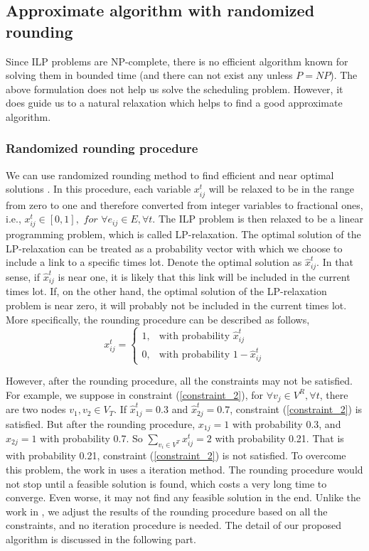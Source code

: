 \documentclass[conference]{IEEEtran}
\begin{document}
\subsection{Approximate algorithm with randomized rounding}

Since ILP problems are NP-complete, there is no efficient algorithm
known for solving them in bounded time (and there can not exist any
unless $P=NP$). The above formulation does not help us solve the
scheduling problem. However, it does guide us to a natural
relaxation which helps to find a good approximate algorithm.
\subsubsection{Randomized rounding procedure}

We can use randomized rounding method to find efficient and near
optimal solutions \cite{raghavan1987rrt}. In this procedure, each
variable $x_{ij}^t$ will be relaxed to be in the range from zero to
one and therefore converted from integer variables to fractional
ones, i.e., $x_{ij}^t \in [0,1], \,\, for \,\,\forall e_{ij}\in E,
\forall t$. The ILP problem is then relaxed to be a linear
programming problem, which is called LP-relaxation. The optimal
solution of the LP-relaxation can be treated as a probability vector
with which we choose to include a link to a specific times lot.
Denote the optimal solution as $\hat{x}_{ij}^t$. In that sense, if
$\hat{x}_{ij}^t$ is near one, it is likely that this link will be
included in the current times lot. If, on the other hand, the
optimal solution of the LP-relaxation problem is near zero, it will
probably not be included in the current times lot. More
specifically, the rounding procedure can be described as follows,
\begin{equation} \label{blean varible x}
x_{ij}^t = \left\{
\begin{array}{ll}
1, & \mbox{with probability}\,\, \hat{x}_{ij}^t\\
0, & \mbox{with probability}\,\, 1-\hat{x}_{ij}^t
\end{array}
\right.
\end{equation}

However, after the rounding procedure, all the constraints may not
be satisfied. For example, we suppose in constraint
(\ref{constraint_2}), for $\forall v_j\in V^R, \forall t$, there are
two nodes $v_{1}, v_{2}\in V_{T}$. If $\hat{x}_{1j}^t = 0.3$ and
$\hat{x}_{2j}^t = 0.7$, constraint (\ref{constraint_2}) is
satisfied. But after the rounding procedure, $x_{1j}=1$ with
probability 0.3, and $x_{2j}=1$ with probability 0.7. So
$\sum_{v_i\in V^T} x_{ij}^t = 2$ with probability 0.21. That is with
probability 0.21, constraint (\ref{constraint_2}) is not satisfied.
To overcome this problem, the work in \cite{friderikos2006non} uses
a iteration method. The rounding procedure would not stop until a
feasible solution is found, which costs a very long time to
converge. Even worse, it may not find any feasible solution in the
end. Unlike the work in \cite{friderikos2006non}, we adjust the
results of the rounding procedure based on all the constraints, and
no iteration procedure is needed. The detail of our proposed
algorithm is discussed in the following part.
\end{document}

